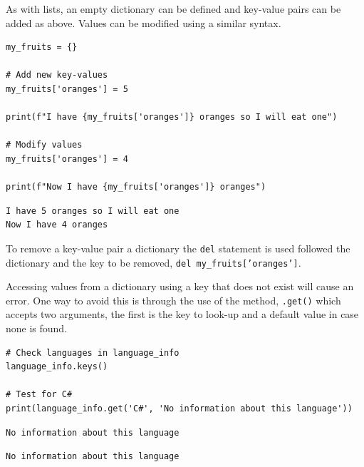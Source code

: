 \documentclass[10pt]{book}
\begin{document}
As with lists, an empty dictionary can be defined and key-value pairs can be added as above. Values can be modified using a similar syntax.

\label{org66e5f95}
\begin{verbatim}
my_fruits = {}

# Add new key-values
my_fruits['oranges'] = 5

print(f"I have {my_fruits['oranges']} oranges so I will eat one")

# Modify values
my_fruits['oranges'] = 4

print(f"Now I have {my_fruits['oranges']} oranges")
\end{verbatim}

\label{orgd940873}
\begin{verbatim}
I have 5 oranges so I will eat one
Now I have 4 oranges
\end{verbatim}

To remove a key-value pair a dictionary the \texttt{del} statement is used followed the dictionary and the key to be removed, \texttt{del my_fruits['oranges']}.

Accessing values from a dictionary using a key that does not exist will cause an error. One way to avoid this is through the use of the method, \texttt{.get()} which accepts two arguments, the first is the key to look-up and a default value in case none is found.

\label{org08d7397}
\begin{verbatim}
# Check languages in language_info
language_info.keys()

# Test for C#
print(language_info.get('C#', 'No information about this language'))
\end{verbatim}

\label{orgb724cd3}
\begin{verbatim}
No information about this language
\end{verbatim}

\label{org4189576}
\begin{verbatim}
No information about this language
\end{verbatim}
\end{document}
